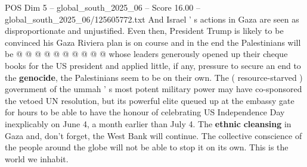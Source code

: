 \begin{textsample}{POS Dim 5 – global\_south\_2025\_06 – Score 16.00 – global\_south\_2025\_06/125605772.txt}
And Israel ' s actions in Gaza are seen as disproportionate and unjustified.
Even then, President Trump is likely to be convinced his Gaza Riviera plan is on course and in the end the Palestinians will be @ @ @ @ @ @ @ @ @ @ whose leaders generously opened up their cheque books for the US president and applied little, if any, pressure to secure an end to the \textbf{genocide}, the Palestinians seem to be on their own.
The ( resource-starved ) government of the ummah ' s most potent military power may have co-sponsored the vetoed UN resolution, but its powerful elite queued up at the embassy gate for hours to be able to have the honour of celebrating US Independence Day inexplicably on June 4, a month earlier than July 4.
The \textbf{ethnic} \textbf{cleansing} in Gaza and, don't forget, the West Bank will continue.
The collective conscience of the people around the globe will not be able to stop it on its own.
This is the world we inhabit.

\end{textsample}
